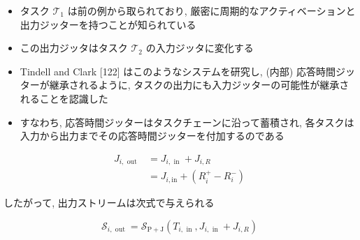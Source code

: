 \begin{frame}{}
\end{frame}

\begin{frame}{}
    \begin{itemize}
        \item タスク $\mathcal{T}_{1}$ は前の例から取られており, 厳密に周期的なアクティベーションと出力ジッターを持つことが知られている
        \item この出力ジッタはタスク $\mathcal{T}_{2}$ の入力ジッタに変化する
    \end{itemize}
\end{frame}

\begin{frame}{}
    \begin{itemize}
        \item Tindell and Clark [122] はこのようなシステムを研究し,  (内部) 応答時間ジッターが継承されるように, タスクの出力にも入力ジッターの可能性が継承されることを認識した
        \item すなわち, 応答時間ジッターはタスクチェーンに沿って蓄積され, 各タスクは入力から出力までその応答時間ジッターを付加するのである


    \end{itemize}
    \begin{equation*}
        \begin{aligned}
            J_{i, \text { out }} & =J_{i, \text { in }}+J_{i, R}                        \\
                                 & =J_{i, \mathrm{in}}+\left(R_{i}^{+}-R_{i}^{-}\right)
        \end{aligned}
    \end{equation*}
\end{frame}

\begin{frame}{}
    したがって, 出力ストリームは次式で与えられる

    \begin{equation*}
        \mathcal{S}_{i, \text { out }}=\mathcal{S}_{\mathrm{P}+\mathrm{J}}\left(T_{i, \text { in }}, J_{i, \text { in }}+J_{i, R}\right)
    \end{equation*}
\end{frame}

